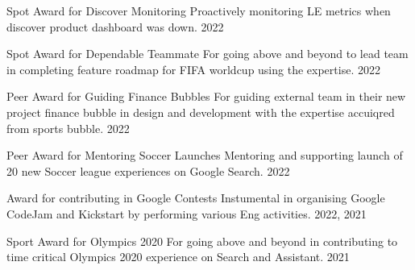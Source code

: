 




\begin{cvhonors}


\cvhonor
{Spot Award for Discover Monitoring} %
{Proactively monitoring LE metrics when discover product dashboard was down.} %
{} %
{2022} %


\cvhonor
{Spot Award for Dependable Teammate} %
{For going above and beyond to lead team in completing feature roadmap for FIFA worldcup using the expertise.} %
{} %
{2022} %


\cvhonor
{Peer Award for Guiding Finance Bubbles} %
{For guiding external team in their new project finance bubble in design and development with the expertise accuiqred from sports bubble.} %
{} %
{2022} %


\cvhonor
{Peer Award for Mentoring Soccer Launches} %
{Mentoring and supporting launch of 20 new Soccer league experiences on Google Search.} %
{} %
{2022} %


\cvhonor
{Award for contributing in Google Contests} %
{Instumental in organising Google CodeJam and Kickstart by performing various Eng activities.} %
{} %
{2022, 2021} %


\cvhonor
{Sport Award for Olympics 2020} %
{For going above and beyond in contributing to time critical Olympics 2020 experience on Search and Assistant.} %
{} %
{2021} %


\end{cvhonors}
